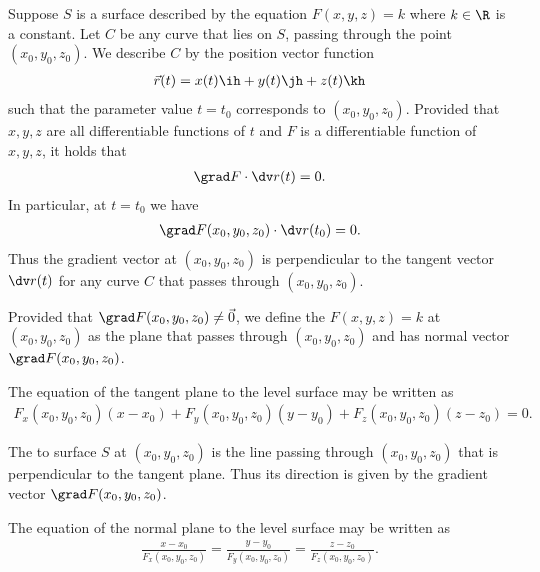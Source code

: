 \documentclass{article}
\begin{document}
\begin{theorem}
    Suppose $S$ is a surface described by the equation $F(x,y,z)=k$ where
    $k\in\R$ is a constant. Let $C$ be any curve that lies on $S$, passing
    through the point $(x_0,y_0,z_0)$. We describe $C$ by the position vector
    function
    \begin{align*}
        \vec r(t) = x(t)\ih + y(t)\jh + z(t)\kh
    \end{align*}
    such that the parameter value $t=t_0$ corresponds to $(x_0, y_0, z_0)$.
    Provided that $x,y,z$ are all differentiable functions of $t$ and $F$
    is a differentiable function of $x,y,z$, it holds that
    \begin{align*}
        \grad F \cdot \dv r(t) = 0.
    \end{align*}
    In particular, at $t=t_0$ we have
    \begin{align*}
        \grad F(x_0, y_0, z_0)\cdot \dv r(t_0) = 0.
    \end{align*}
    Thus the gradient vector at $(x_0, y_0, z_0)$ is perpendicular to the
    tangent vector $\dv r(t)$ for any curve $C$ that passes through 
    $(x_0, y_0, z_0)$.
\end{theorem}
\begin{definition}
    Provided that $\grad F(x_0, y_0, z_0)\not=\vec 0$, we define the
     $F(x,y,z)=k$ at $(x_0, y_0, z_0)$
    as the plane that passes through $(x_0, y_0, z_0)$ and has normal vector
    $\grad F(x_0, y_0, z_0)$.
\end{definition}
\begin{theorem}
    The equation of the tangent plane to the level surface may be written as
    \begin{align*}
        F_x(x_0, y_0, z_0)(x-x_0)+F_y(x_0, y_0, z_0)(y-y_0)+F_z(x_0, y_0, z_0)(z-z_0)=0.
    \end{align*}
\end{theorem}
\begin{definition}
    The  to surface $S$ at $(x_0, y_0, z_0)$ is the line
    passing through $(x_0, y_0, z_0)$ that is perpendicular to the tangent
    plane. Thus its direction is given by the gradient vector 
    $\grad F(x_0, y_0, z_0)$.
\end{definition}
\begin{theorem}
    The equation of the normal plane to the level surface may be written as
    \begin{align*}
        \frac{x-x_0}{F_x(x_0, y_0, z_0)}
        =\frac{y-y_0}{F_y(x_0, y_0, z_0)}
        =\frac{z-z_0}{F_z(x_0, y_0, z_0)}.
    \end{align*}
\end{theorem}
\end{document}
